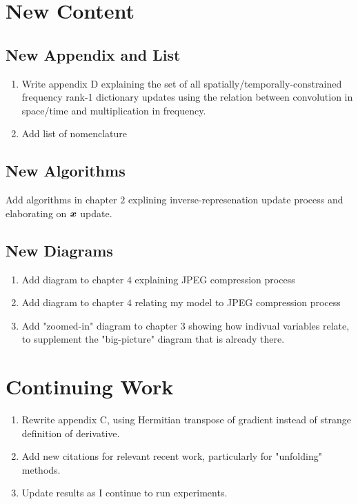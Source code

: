 \documentclass{article}
\begin{document}
\section{New Content}
\subsection{New Appendix and List}
\begin{enumerate}
\item  Write appendix D explaining the set of all spatially/temporally-constrained frequency rank-1 dictionary updates using the relation between convolution in space/time and multiplication in frequency.


\item   Add list of nomenclature
\end{enumerate}

\subsection{New Algorithms}
Add algorithms in chapter $2$ explining inverse-represenation update process and elaborating on $\bm{x}$ update.

\subsection{New Diagrams}
\begin{enumerate}
\item
Add diagram to chapter $4$ explaining JPEG compression process
\item
Add diagram to chapter $4$ relating my model to JPEG compression process
\item
Add "zoomed-in" diagram to chapter $3$ showing how indivual variables relate, to supplement the "big-picture" diagram that is already there.
\end{enumerate}

\section{Continuing Work}
\begin{enumerate}
\item
Rewrite appendix C, using Hermitian transpose of gradient instead of strange definition of derivative.
\item
Add new citations for relevant recent work, particularly for "unfolding" methods.
\item
Update results as I continue to run experiments.
\end{enumerate}
\end{document}
